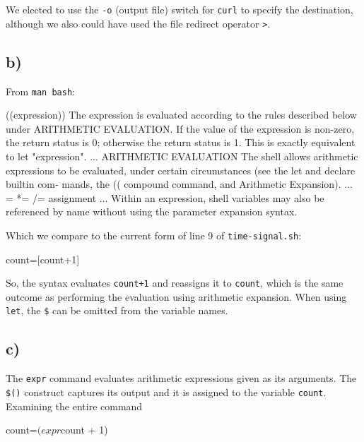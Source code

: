 \documentclass{article}
\begin{document}
We elected to use the \texttt{-o} (output file) switch for \texttt{curl} to specify the destination, although we also could have used the file redirect operator \texttt{>}. 

\subsection{b)}

From \texttt{man bash}:

\begin{bashinline}
((expression))
      The expression is evaluated according to the rules described below under ARITHMETIC EVALUATION.  If the value of the expression is non-zero, the return status is 0; otherwise the return  status is 1.  This is exactly equivalent to let "expression".
...
ARITHMETIC EVALUATION
       The shell allows arithmetic expressions to be evaluated,  under
       certain  circumstances  (see  the  let and declare builtin com‐
       mands, the ((  compound  command,  and  Arithmetic  Expansion).
...
       = *= /= %
              assignment
...
        Within an expression, shell variables may also be referenced by name
        without using  the parameter  expansion  syntax.
\end{bashinline}

Which we compare to the current form of line 9 of \texttt{time-signal.sh}:

\begin{bashcode}
count=$[$count+1]
\end{bashcode}

So, the syntax  evaluates \texttt{count+1} and reassigns it to \texttt{count}, which is the same outcome as performing the evaluation using arithmetic expansion. When using \texttt{let}, the \texttt{\$} can be omitted from the variable names.

\subsection{c)}

The \texttt{expr} command evaluates arithmetic expressions given as its arguments. The \texttt{\$()} construct captures its output and it is assigned to the variable \texttt{count}. Examining the entire command

\begin{bashcode}
count=$(expr $count + 1)
\end{bashcode}
\end{document}
